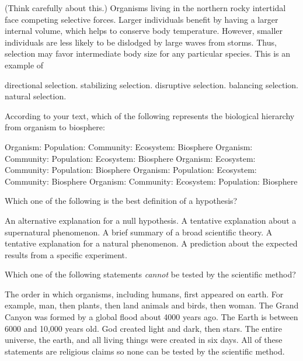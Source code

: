 \question
(Think carefully about this.) Organisms living in the northern rocky intertidal face competing selective forces. Larger individuals benefit by having a larger internal volume, which helps to conserve body temperature. However, smaller individuals are less likely to be dislodged by large waves from storms. Thus, selection may favor intermediate body size for any particular species. This is an example of

\begin{choices}
\choice directional selection. %
\choice stabilizing selection. %
\choice disruptive selection. %
\correctchoice balancing selection. %
\choice natural selection. %
\end{choices}

\question
According to your text, which of the following represents the biological hierarchy from organism to biosphere:

\begin{choices}
\correctchoice Organism: Population: Community: Ecosystem: Biosphere %
\choice Organism: Community: Population: Ecosystem: Biosphere %
\choice Organism: Ecosystem: Community: Population: Biosphere %
\choice Organism: Population: Ecosystem: Community: Biosphere %
\choice Organism: Community: Ecosystem: Population: Biosphere %
\end{choices}


\question
Which one of the following is the best definition of a hypothesis?

\begin{choices}
\choice An alternative explanation for a null hypothesis.%
\choice A tentative explanation about a supernatural phenomenon.%
\choice A brief summary of a broad scientific theory.%
\correctchoice A tentative explanation for a natural phenomenon.%
\choice A prediction about the expected results from a specific experiment.%
\end{choices}

\question
Which one of the following statements \emph{cannot} be tested by the scientific method?

\begin{choices}
\choice The order in which organisms, including humans, first appeared on earth. For example, man, then plants, then land animals and birds, then woman.%
\choice The Grand Canyon was formed by a global flood about 4000 years ago.%
\choice The Earth is between 6000 and 10,000 years old.%
\correctchoice God created light and dark, then stars.%
\choice The entire universe, the earth, and all living things were created in six days.%
\choice All of these statements are religious claims so none can be tested by the scientific method.%
\end{choices}
